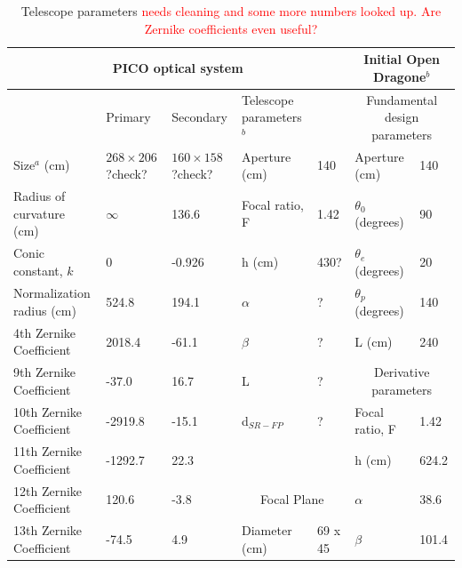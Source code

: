 \documentclass[]{spie}  %
\newcommand{\comr}[1]{\textcolor{red}{#1}}
\begin{document}
\begin{table}[ht]
\centering
\caption{Telescope parameters \comr{needs cleaning and some more numbers looked up.  Are Zernike coefficients even useful?} \label{tab:optics}}
\begin{adjustbox}{width=1.1\textwidth}
\begin{tabular}{|l|llll||ll|}
\hline
\multicolumn{5}{|c||}{PICO optical system}                                    & \multicolumn{2}{c|}{Initial Open Dragone$^b$}     \\ \hline
                          & Primary           & Secondary         & Telescope parameters$^b$   &     & \multicolumn{2}{c|}{Fundamental design parameters}  \\
Size$^a$ (cm)                 & $268 \times 206$ ?check? & $160 \times 158$ ?check? & Aperture (cm)        & 140     & Aperture (cm)            & 140   \\
Radius of curvature (cm)  & $\infty$         & 136.6             & Focal ratio, F            & 1.42    & $\theta_0$ (degrees)              & 90    \\
Conic constant, $k$       & 0                 & -0.926            & h (cm)                    & 430?    & $\theta_e$ (degrees)              & 20    \\
Normalization radius (cm) & 524.8             & 194.1             & $\alpha$                  & ?       & $\theta_p$ (degrees)              & 140   \\
4th Zernike Coefficient   & 2018.4            & -61.1             & $\beta$                   &  ?      & L (cm)                         & 240   \\
9th Zernike Coefficient   & -37.0             & 16.7              & L                         &   ?     & \multicolumn{2}{c|}{Derivative parameters}  \\
10th Zernike Coefficient  & -2919.8           & -15.1             & d$_{SR-FP}$               &    ?    & Focal ratio, F                 & 1.42  \\
11th Zernike Coefficient  & -1292.7           & 22.3              &                           &         & h (cm)                         & 624.2 \\
12th Zernike Coefficient  & 120.6             & -3.8              &   \multicolumn{2}{c||}{Focal Plane}  & $\alpha$                          & 38.6  \\
13th Zernike Coefficient  & -74.5             & 4.9               & Diameter (cm)          & 69 x 45  & $\beta$                           & 101.4 \\

\end{tabular}
\end{adjustbox}
\end{table}
\end{document}

